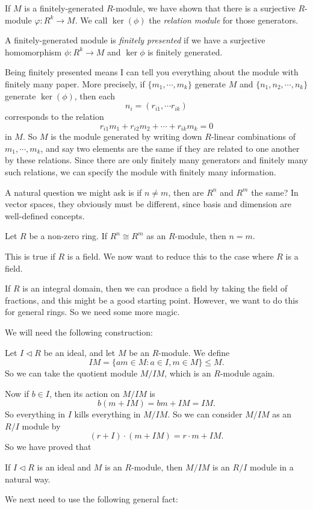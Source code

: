 \documentclass[a4paper]{article}
\begin{document}
\begin{defi}[Relations]
  If $M$ is a finitely-generated $R$-module, we have shown that there is a surjective $R$-module $\varphi: R^k \to M$. We call $\ker(\phi)$ the \emph{relation module} for those generators.
\end{defi}

\begin{defi}
  A finitely-generated module is \emph{finitely presented} if we have a surjective homomorphism $\phi: R^k \to M$ and $\ker \phi$ is finitely generated.
\end{defi}

Being finitely presented means I can tell you everything about the module with finitely many paper. More precisely, if $\{m_1, \cdots, m_k\}$ generate $M$ and $\{n_1, n_2, \cdots, n_k\}$ generate $\ker(\phi)$, then each
\[
  n_i = (r_{i1}, \cdots r_{ik})
\]
corresponds to the relation
\[
  r_{i1}m_1 + r_{i2}m_2 + \cdots + r_{ik}m_k = 0
\]
in $M$. So $M$ is the module generated by writing down $R$-linear combinations of $m_1, \cdots, m_k$, and say two elements are the same if they are related to one another by these relations. Since there are only finitely many generators and finitely many such relations, we can specify the module with finitely many information.

A natural question we might ask is if $n \not= m$, then are $R^n$ and $R^m$ the same? In vector spaces, they obviously must be different, since basis and dimension are well-defined concepts.

\begin{prop}
  Let $R$ be a non-zero ring. If $R^n \cong R^m$ as an $R$-module, then $n = m$.
\end{prop}
This is true if $R$ is a field. We now want to reduce this to the case where $R$ is a field.

If $R$ is an integral domain, then we can produce a field by taking the field of fractions, and this might be a good starting point. However, we want to do this for general rings. So we need some more magic.

We will need the following construction:

Let $I \lhd R$ be an ideal, and let $M$ be an $R$-module. We define
\[
  IM = \{a m \in M: a \in I, m \in M\} \leq M.
\]
So we can take the quotient module $M/IM$, which is an $R$-module again.

Now if $b \in I$, then its action on $M/IM$ is
\[
  b (m + IM) = bm + IM = IM.
\]
So everything in $I$ kills everything in $M/IM$. So we can consider $M/IM$ as an $R/I$ module by
\[
  (r + I)\cdot (m + IM) = r\cdot m + IM.
\]
So we have proved that
\begin{prop}
  If $I\lhd R$ is an ideal and $M$ is an $R$-module, then $M/IM$ is an $R/I$ module in a natural way.
\end{prop}
We next need to use the following general fact:
\end{document}
